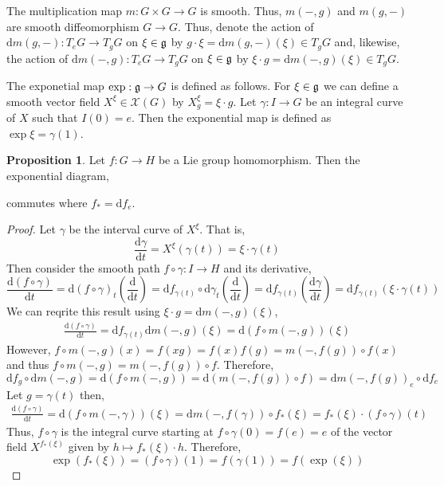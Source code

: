 \documentclass[12pt]{extarticle}
\theoremstyle{definition}
\newtheorem{proposition}[theorem]{Proposition}
\newenvironment{definition}[1][Definition:]{\begin{trivlist}
\item[\hskip \labelsep {\bfseries #1}]}{\end{trivlist}}
\renewcommand{\d}[1]{\mathrm{d} #1}
\newcommand{\deriv}[2]{\frac{\d{#1}}{\d{#2}}}
\begin{document}
\begin{definition}
The multiplication map $m : G \times G \to G$ is smooth. Thus, $m(-,g)$ and $m(g,-)$ are smooth diffeomorphism $G \to G$. Thus, denote the action of $\d{m(g,-)} : T_e G \to T_g G$ on $\xi \in \mathfrak{g}$ by $g \cdot \xi = \d{m(g,-)}(\xi) \in T_g G$ and, likewise, the action of $\d{m(-,g)} : T_e G \to T_g G$ on $\xi \in \mathfrak{g}$ by $\xi \cdot g = \d{m(-,g)}(\xi) \in T_g G$. 
\end{definition}

\begin{definition}
The exponetial map $\exp : \mathfrak{g} \to G$ is defined as follows. For $\xi \in \mathfrak{g}$ we can define a smooth vector field $X^{\xi} \in \mathscr{X}(G)$ by $X^{\xi}_g = \xi \cdot g$. Let $\gamma : I \to G$ be an integral curve of $X$ such that $I(0) = e$. Then the exponential map is defined as $\exp{\xi} = \gamma(1)$. 
\end{definition}

\begin{proposition}
Let $f : G \to H$ be a Lie group homomorphism. Then the exponential diagram,
\begin{center}
\end{center}
commutes where $f_* = \d{f}_e$. 
\end{proposition}

\begin{proof}
Let $\gamma$ be the interval curve of $X^\xi$. That is,
\[ \deriv{\gamma}{t} = X^{\xi}(\gamma(t)) = \xi \cdot \gamma(t) \]
Then consider the smooth path $f \circ \gamma : I \to H$ and its derivative,
\[ \deriv{(f \circ \gamma)}{t} = \d{(f \circ \gamma)}_t\left( \deriv{}{t} \right) = \d{f}_{\gamma(t)} \circ \d{\gamma}_t \left( \deriv{}{t} \right) = \d{f}_{\gamma(t)} \left( \deriv{\gamma}{t} \right) = \d{f}_{\gamma(t)} (\xi \cdot \gamma(t)) \]
We can reqrite this result using $\xi \cdot g = \d{m(-,g)}(\xi)$,
\begin{align*}
\deriv{(f \circ \gamma)}{t} = \d{f}_{\gamma(t)} \d{m(-,g)}(\xi) = \d{(f \circ m(-,g))}(\xi) 
\end{align*}
However, $f \circ m(-,g)(x) = f(xg) = f(x) f(g) = m(-,f(g)) \circ f(x)$ and thus $f \circ m(-,g) = m(-,f(g)) \circ f$. Therefore,
\[ \d{f}_g \circ \d{m(-,g)} = \d{(f \circ m(-,g))} = \d{(m(-,f(g)) \circ f)} = \d{m(-,f(g))}_e \circ \d{f}_e \]
Let $g = \gamma(t)$ then,
\begin{align*}
\deriv{(f \circ \gamma)}{t} = \d{(f \circ m(-, \gamma))}(\xi) = \d{m(-,f(\gamma))} \circ f_*(\xi) = f_*(\xi) \cdot (f \circ \gamma)(t)
\end{align*}
Thus, $f \circ \gamma$ is the integral curve starting at $f \circ \gamma(0) = f(e) = e$ of the vector field $X^{f_*(\xi)}$ given by $h \mapsto f_*(\xi) \cdot h$. Therefore,
\[ \exp(f_*(\xi)) = (f \circ \gamma)(1) = f(\gamma(1)) = f(\exp(\xi)) \]
\end{proof}
\end{document}
